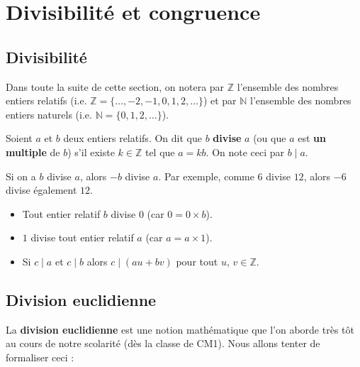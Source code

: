 



	\section{Divisibilité et congruence}

	\subsection{Divisibilité}

	Dans toute la suite de cette section, on notera par $\mathbb{Z}$ l'ensemble des nombres entiers relatifs (i.e. $\mathbb{Z} = \{\dots, -2, -1, 0, 1, 2, \dots\}$) et par $\mathbb{N}$ l'ensemble des nombres entiers naturels (i.e. $\mathbb{N} = \{0, 1, 2, \dots\}$).

	\begin{formula}[Définition]
		Soient $a$ et $b$ deux entiers relatifs. On dit que $b$ \textbf{divise} $a$ (ou que $a$ est \textbf{un multiple} de $b$) s'il existe $k \in \mathbb{Z}$ tel que $a = kb$. On note ceci par $b \mid a$.
	\end{formula}

	\begin{tip}
		Si on a $b$ divise $a$, alors $-b$ divise $a$. Par exemple, comme $6$ divise $12$, alors $-6$ divise également $12$.
	\end{tip}

	\begin{formula}[Propriétés]
		\begin{itemize}
			\item Tout entier relatif $b$ divise $0$ (car $0 = 0 \times b$).
			\item $1$ divise tout entier relatif $a$ (car $a = a \times 1$).
			\item Si $c \mid a$ et $c \mid b$ alors $c \mid (au + bv)$ pour tout $u$, $v \in \mathbb{Z}$.
		\end{itemize}
	\end{formula}

	\subsection{Division euclidienne}

	La \textbf{division euclidienne} est une notion mathématique que l'on aborde très tôt au cours de notre scolarité (dès la classe de CM1). Nous allons tenter de formaliser ceci :

